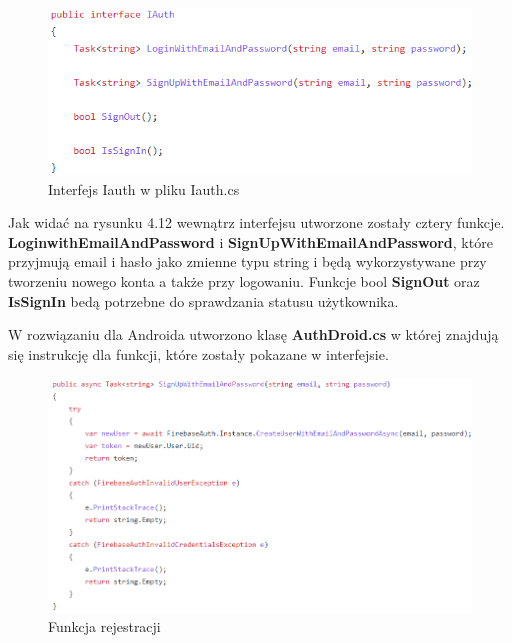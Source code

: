  \begin{figure}[!htb]
 	\begin{center}
 		\includegraphics[width=12cm]{rys/iauth.png}
 		\caption{Interfejs Iauth w pliku Iauth.cs}
 		\label{rys:rysunek023}
 	\end{center}
 \end{figure}

Jak widać na rysunku 4.12 wewnątrz interfejsu utworzone zostały cztery funkcje. \textbf{LoginwithEmailAndPassword}  i \textbf{SignUpWithEmailAndPassword}, które przyjmują email i hasło jako zmienne typu string i będą wykorzystywane przy tworzeniu nowego konta a także przy logowaniu. Funkcje bool \textbf{SignOut} oraz \textbf{IsSignIn} bedą potrzebne do sprawdzania statusu użytkownika. \newline \newline 

W rozwiązaniu dla Androida utworzono klasę \textbf{AuthDroid.cs} w której znajdują się instrukcję dla funkcji, które zostały pokazane w interfejsie. 

\begin{figure}[!htb]
	\begin{center}
		\includegraphics[width=16cm]{rys/authdroid1.png}
		\caption{Funkcja rejestracji}
		\label{rys:rysunek024}
	\end{center}
\end{figure}

